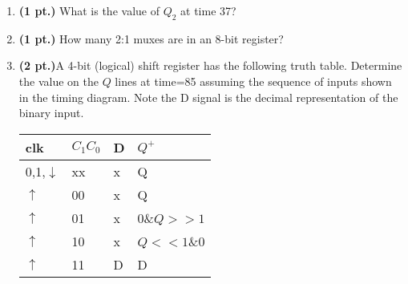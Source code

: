\documentclass{article}
\begin{document}
\begin{enumerate}
\item {\bf (1 pt.)} What is the value of $Q_2$ at time 37?

\item {\bf (1 pt.)} How many 2:1 muxes are in an 8-bit register?

\pagebreak
\item {\bf (2 pt.)}A 4-bit (logical) shift register has the 
following truth table.  Determine the value on the $Q$ lines 
at time=85 assuming the sequence of inputs shown in the 
timing diagram. Note the D signal is the decimal representation
of the binary input.

\begin{tabular}{l|l|l||l}
clk		& $C_1 C_0$	& D & $Q^+$	\\ \hline
0,1,$\downarrow$& xx		& x & Q		\\ \hline
$\uparrow$ 	& 00		& x & Q		\\  \hline
$\uparrow$ 	& 01		& x & 0\&$Q>>1$	\\  \hline
$\uparrow$ 	& 10		& x & $Q<<1$\&0	\\  \hline
$\uparrow$ 	& 11		& D & D		\\
\end{tabular}




\end{enumerate}
\end{document}
